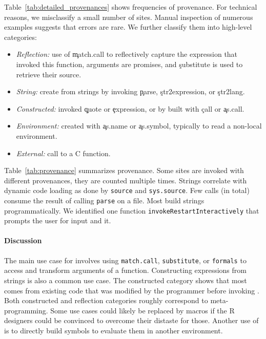 \documentclass[screen,acmsmall]{acmart}%
\newcommand{\code}[1]{\lstinline |#1|\xspace}
\begin{document}
Table~\ref{tab:detailed_provenances} shows frequencies of provenance. For
technical reasons, we misclassify a small number of sites. Manual inspection of
numerous examples suggests that errors are rare. We further classify them into
high-level categories:

\begin{itemize}[---]
\item {\it Reflection:} use of \c{match.call} to reflectively capture the
  expression that invoked this function, arguments are promises, and
  \c{substitute} is used to retrieve their source.
\item {\it String:} create from strings by invoking \c{parse},
  \c{str2expression}, or \c{str2lang}.
\item {\it Constructed:} invoked \c{quote} or \c{expression}, or by built with
  \c{call} or \c{as.call}.
\item {\it Environment: } created with \c{as.name} or \c{as.symbol}, typically
  to read a non-local environment.
\item {\it External: }  call to a C function. %
\end{itemize}

Table~\ref{tab:provenance} summarizes provenance. Some sites are invoked with
different provenances, they are counted multiple times. Strings correlate with
dynamic code loading as done by \code{source} and \code{sys.source}. Few calls
(\packageNbParseFromFileSites in total) consume the result of calling \code{parse}
on a file. Most build strings programmatically. We identified one function
\code{invokeRestartInteractively} that prompts the user for input and \evals it.




\paragraph{Discussion}
The main use case for \eval involves using \code{match.call}, \code{substitute}, or
\code{formals} to access and transform arguments of a function. Constructing
expressions from strings is also a common use case. The constructed category
shows that most \evals comes from existing code that was modified by the
programmer before invoking \eval. Both constructed and reflection categories
roughly correspond to meta-programming. Some use cases could likely be replaced
by macros if the R designers could be convinced to overcome their distaste for
those. Another use of \eval is to directly build symbols to evaluate them in
another environment.
\end{document}
